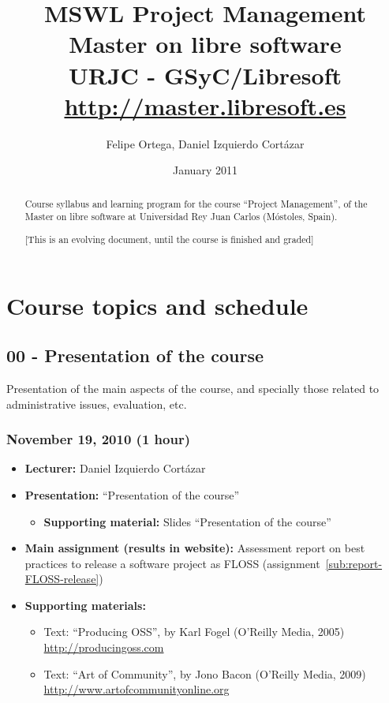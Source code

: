 \documentclass[a4paper]{article}
\title{MSWL Project Management \\
Master on libre software \\
URJC - GSyC/Libresoft \\
\url{http://master.libresoft.es}}
\author{Felipe Ortega, Daniel Izquierdo Cortázar}
\date{January 2011}
\begin{document}
\maketitle

\begin{abstract}
Course syllabus and learning program for the course ``Project Management'', of the Master on libre software at Universidad Rey Juan Carlos (Móstoles, Spain).

[This is an evolving document, until the course is finished and graded]
\end{abstract}

\tableofcontents

\section{Course topics and schedule}

\subsection{00 - Presentation of the course}

Presentation of the main aspects of the course, and specially those related to administrative issues, evaluation, etc.

\subsubsection{November 19, 2010 (1 hour)}

\begin{itemize}
\item \textbf{Lecturer:} Daniel Izquierdo Cortázar
\item \textbf{Presentation:} ``Presentation of the course''
  \begin{itemize}
  \item \textbf{Supporting material:} Slides ``Presentation of the course''
  \end{itemize}
\item \textbf{Main assignment (results in website):} Assessment report on best practices to release a software project as FLOSS (assignment~\ref{sub:report-FLOSS-release})

\item \textbf{Supporting materials:} 
  \begin{itemize}
  \item Text: ``Producing OSS'', by Karl Fogel (O'Reilly Media, 2005)\\
    \url{http://producingoss.com}
  \item Text: ``Art of Community'', by Jono Bacon (O'Reilly Media, 2009)\\
    \url{http://www.artofcommunityonline.org} 
  \end{itemize}
\end{itemize}
\end{document}
